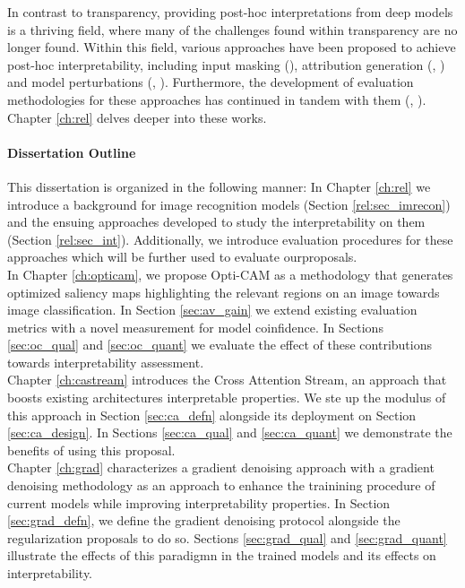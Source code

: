 In contrast to transparency, providing post-hoc interpretations from deep models is a 
thriving field, where many of the challenges found within transparency are no longer found.
Within this field, various approaches have been proposed to achieve post-hoc interpretability,
including input masking (\cite{petsiuk2018rise}), attribution generation (\cite{NIPS2017_7062}, 
\cite{zhou2016learning}) and model perturbations 
(\cite{fong2017interpretable}, \cite{fong2019understanding}). Furthermore, the development of 
evaluation methodologies for these approaches has continued in tandem with them 
(\cite{choe2020evaluating}, \cite{chattopadhay2018grad}). Chapter \ref{ch:rel} delves deeper into 
these works. 

\paragraph{Dissertation Outline}
\noindent This dissertation is organized in the following manner: In Chapter \ref{ch:rel} we 
introduce a background for image recognition models (Section \ref{rel:sec_imrecon}) and the ensuing 
approaches developed to study the interpretability on them (Section \ref{rel:sec_int}). 
Additionally, we introduce evaluation procedures for these approaches which will be further used to 
evaluate ourproposals.\\

\noindent In Chapter \ref{ch:opticam}, we propose Opti-CAM as a methodology that generates 
optimized saliency maps highlighting the relevant regions on an image towards image classification. 
In Section \ref{sec:av_gain} we extend existing evaluation metrics with a novel measurement for 
model coinfidence. 
In Sections \ref{sec:oc_qual} and \ref{sec:oc_quant} we evaluate the effect of these contributions 
towards interpretability assessment.\\

\noindent Chapter \ref{ch:castream} introduces the Cross Attention Stream, an approach that boosts existing 
architectures interpretable properties. We ste up the modulus of this approach in 
Section \ref{sec:ca_defn} alongside its deployment on Section \ref{sec:ca_design}. 
In Sections \ref{sec:ca_qual} and \ref{sec:ca_quant} we demonstrate the benefits of using this
proposal.\\

\noindent Chapter \ref{ch:grad} characterizes a gradient denoising approach with a gradient denoising 
methodology as an approach to enhance the trainining procedure of current models while improving 
interpretability properties. In Section \ref{sec:grad_defn}, we define the gradient denoising 
protocol alongside the regularization proposals to do so.
Sections \ref{sec:grad_qual} and \ref{sec:grad_quant} illustrate the effects of this paradigmn
in the trained models and its effects on interpretability.\\

